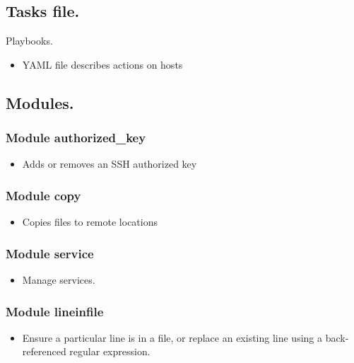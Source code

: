 \documentclass[16pt]{beamer}
\begin{document}
\subsection{Tasks file.}
\begin{frame}{Playbooks.}
  \begin{itemize}
  \item
  YAML file describes actions on hosts
  \end{itemize}
  
\end{frame}


\subsection{Modules.}

\begin{frame}[fragile]
\frametitle{Module authorized\_key}
  \begin{itemize}
  \item
  Adds or removes an SSH authorized key
  \end{itemize}
  
\end{frame}

\begin{frame}[fragile]
\frametitle{Module copy}
  \begin{itemize}
  \item
  Copies files to remote locations
  \end{itemize}
  
\end{frame}


\begin{frame}[fragile]
\frametitle{Module service}
  \begin{itemize}
  \item
  Manage services.
  \end{itemize}
  
  
\end{frame}

\begin{frame}[fragile]
\frametitle{Module lineinfile}
  \begin{itemize}
  \item
  Ensure a particular line is in a file, or replace an existing line using a
  back-referenced regular expression.
  \end{itemize}
  
\end{frame}
\end{document}
